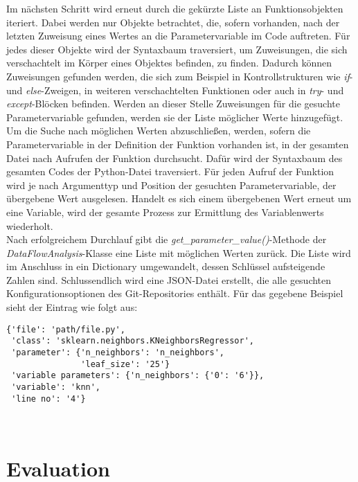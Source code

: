 \documentclass[german,bachelor]{swsLeipzig}
\begin{document}
Im nächsten Schritt wird erneut durch die gekürzte Liste an Funktionsobjekten iteriert.
Dabei werden nur Objekte betrachtet, die, sofern vorhanden, nach der letzten Zuweisung eines Wertes an die
Parametervariable im Code auftreten.
Für jedes dieser Objekte wird der Syntaxbaum traversiert, um Zuweisungen, die sich verschachtelt im Körper eines Objektes
befinden, zu finden.
Dadurch können Zuweisungen gefunden werden, die sich zum Beispiel in Kontrollstrukturen wie \textit{if}- und \textit{else}-Zweigen,
in weiteren verschachtelten Funktionen oder auch in \textit{try}- und \textit{except}-Blöcken befinden.
Werden an dieser Stelle Zuweisungen für die gesuchte Parametervariable gefunden, werden sie der Liste möglicher Werte hinzugefügt. \\

Um die Suche nach möglichen Werten abzuschließen, werden, sofern die Parametervariable in der Definition der Funktion vorhanden ist,
in der gesamten Datei nach Aufrufen der Funktion durchsucht.
Dafür wird der Syntaxbaum des gesamten Codes der Python-Datei traversiert.
Für jeden Aufruf der Funktion wird je nach Argumenttyp und Position der gesuchten Parametervariable, der übergebene
Wert ausgelesen.
Handelt es sich einem übergebenen Wert erneut um eine Variable, wird der gesamte Prozess zur Ermittlung des Variablenwerts wiederholt. \\

Nach erfolgreichem Durchlauf gibt die \textit{get\_parameter\_value()}-Methode der \textit{DataFlowAnalysis}-Klasse
eine Liste mit möglichen Werten zurück.
Die Liste wird im Anschluss in ein Dictionary umgewandelt, dessen Schlüssel aufsteigende Zahlen sind.
Schlussendlich wird eine JSON-Datei erstellt, die alle gesuchten Konfigurationsoptionen des Git-Repositories enthält.
Für das gegebene Beispiel sieht der Eintrag wie folgt aus: \\

\begin{lstlisting}[frame=single, basicstyle=\small]
{'file': 'path/file.py',
 'class': 'sklearn.neighbors.KNeighborsRegressor',
 'parameter': {'n_neighbors': 'n_neighbors',
               'leaf_size': '25'}
 'variable parameters': {'n_neighbors': {'0': '6'}},
 'variable': 'knn',
 'line no': '4'}
\end{lstlisting}
\


\chapter{Evaluation}\label{Evaluation}
\end{document}
